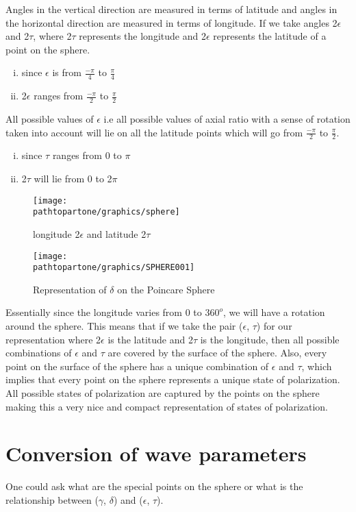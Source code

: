Angles in the vertical direction are measured in terms of latitude and angles in the horizontal direction are measured in terms of longitude. If we take angles 2$\epsilon$ and 2$\tau$, where 2$\tau$ represents the longitude and 2$\epsilon$ represents the latitude of a point on the sphere.
\begin{enumerate}[(i)]
\item	since $\epsilon$ is from $\frac{-\pi}{4}$ to $\frac{\pi}{4}$
\item 	2$\epsilon$ ranges from $\frac{-\pi}{2}$ to $\frac{\pi}{2}$
\end{enumerate}
All possible values of $\epsilon$ i.e all possible values of axial ratio with a sense of rotation taken into account will lie on all the latitude points which will go from $\frac{-\pi}{2}$ to $\frac{\pi}{2}$. 
\begin{enumerate}[(i)]
\item 	since $\tau$ ranges from 0 to $\pi$
\item 	2$\tau$ will lie from 0 to 2$\pi$
\end{enumerate}
\begin{figure}[h]
\centering
\texttt{[image: \\pathtopartone/graphics/sphere]}
\caption{longitude 2$\epsilon$ and latitude 2$\tau$}
\end{figure}
\begin{figure}[h]
\centering
\texttt{[image: \\pathtopartone/graphics/SPHERE001]}
\caption{Representation of $\delta$ on the Poincare Sphere}
\label{fig:sphere001}
\end{figure}

Essentially since the longitude varies from 0 to $360^{o}$, we will have a rotation around the sphere. This means that if we take the pair ($\epsilon$, $\tau$) for our representation where  2$\epsilon$ is the latitude and 2$\tau$ is the longitude, then all possible combinations of $\epsilon$ and $\tau$ are covered by the surface of the sphere.	Also, every point on the surface of the sphere has a unique combination of $\epsilon$ and $\tau$, which implies that every point on the sphere represents a unique state of polarization. All possible states of polarization are captured by the points on the sphere making this a very nice and compact representation of states of polarization.

\section{Conversion of wave parameters}
One could ask what are the special points on the sphere or what is the relationship between ($\gamma$, $\delta$) and ($\epsilon$, $\tau$).  

